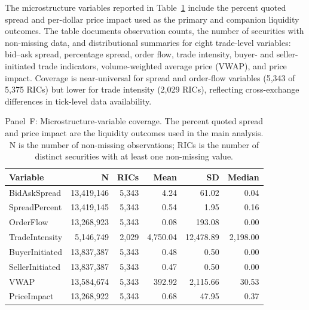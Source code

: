 \documentclass{article}
\theoremstyle{plain}
\begin{document}
The microstructure variables reported in Table~\ref{tab:panel_f} include the percent quoted spread and per-dollar price impact used as the primary and companion liquidity outcomes. The table documents observation counts, the number of securities with non-missing data, and distributional summaries for eight trade-level variables: bid--ask spread, percentage spread, order flow, trade intensity, buyer- and seller-initiated trade indicators, volume-weighted average price (VWAP), and price impact. Coverage is near-universal for spread and order-flow variables (5,343 of 5,375 RICs) but lower for trade intensity (2,029 RICs), reflecting cross-exchange differences in tick-level data availability.

\begin{table}[!ht]
\centering
\footnotesize
\begin{tabular}{l r r r r r}
\toprule
\textbf{Variable} & \textbf{N} & \textbf{RICs} & \textbf{Mean} & \textbf{SD} & \textbf{Median} \\
\midrule
  BidAskSpread & 13,419,146 & 5,343 & 4.24 & 61.02 & 0.04 \\
  SpreadPercent & 13,419,145 & 5,343 & 0.54 & 1.95 & 0.16 \\
  OrderFlow & 13,268,923 & 5,343 & 0.08 & 193.08 & 0.00 \\
  TradeIntensity & 5,146,749 & 2,029 & 4,750.04 & 12,478.89 & 2,198.00 \\
  BuyerInitiated & 13,837,387 & 5,343 & 0.48 & 0.50 & 0.00 \\
  SellerInitiated & 13,837,387 & 5,343 & 0.47 & 0.50 & 0.00 \\
  VWAP & 13,584,674 & 5,343 & 392.92 & 2,115.66 & 30.53 \\
  PriceImpact & 13,268,922 & 5,343 & 0.68 & 47.95 & 0.37 \\
\bottomrule
\end{tabular}
\caption{Panel~F: Microstructure-variable coverage. The percent quoted spread and price impact are the liquidity outcomes used in the main analysis. N is the number of non-missing observations; RICs is the number of distinct securities with at least one non-missing value.}
\label{tab:panel_f}
\end{table}
\end{document}

